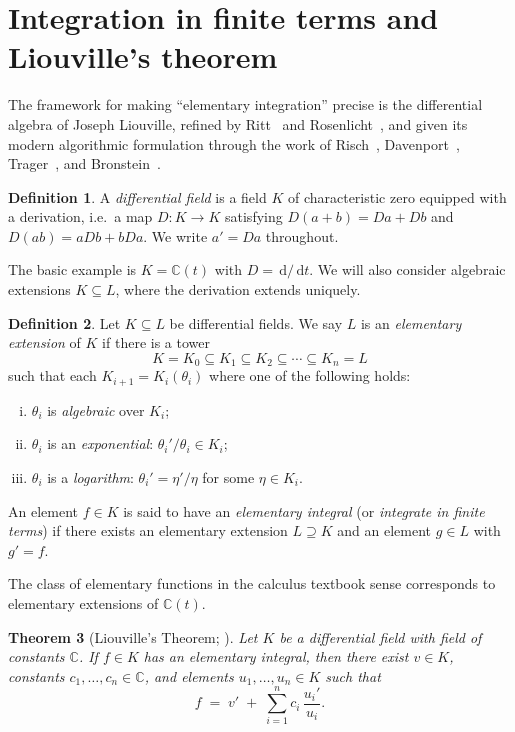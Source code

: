 \documentclass[11pt,a4paper]{article}
\theoremstyle{plain}
\newtheorem{theorem}{Theorem}[section]
\theoremstyle{definition}
\newtheorem{definition}[theorem]{Definition}
\theoremstyle{remark}
\newcommand{\C}{\mathbb{C}}
\renewcommand{\d}{\,\mathrm{d}}
\begin{document}
\section{Integration in finite terms and Liouville's theorem}
\label{sec:liouville}

The framework for making ``elementary integration'' precise is the differential algebra of Joseph Liouville, refined by Ritt~\cite{Ritt1948} and Rosenlicht~\cite{Rosenlicht1972}, and given its modern algorithmic formulation through the work of Risch~\cite{Risch1969,Risch1970}, Davenport~\cite{Davenport1981}, Trager~\cite{Trager1984}, and Bronstein~\cite{Bronstein2005}.

\begin{definition}\label{def:diffield}
A \emph{differential field} is a field $K$ of characteristic zero equipped with a derivation, i.e.\ a map $D \colon K \to K$ satisfying $D(a+b)=Da+Db$ and $D(ab)=aDb+bDa$. We write $a' = Da$ throughout.
\end{definition}

The basic example is $K = \C(t)$ with $D = \d/\d t$. We will also consider algebraic extensions $K\subseteq L$, where the derivation extends uniquely.

\begin{definition}\label{def:elementary}
Let $K\subseteq L$ be differential fields. We say $L$ is an \emph{elementary extension} of $K$ if there is a tower
\[
  K = K_0 \subseteq K_1 \subseteq K_2 \subseteq \cdots \subseteq K_n = L
\]
such that each $K_{i+1} = K_i(\theta_i)$ where one of the following holds:
\begin{enumerate}[(i)]
  \item $\theta_i$ is \emph{algebraic} over $K_i$;
  \item $\theta_i$ is an \emph{exponential}: $\theta_i'/\theta_i \in K_i$;
  \item $\theta_i$ is a \emph{logarithm}: $\theta_i' = \eta'/\eta$ for some $\eta \in K_i$.
\end{enumerate}
An element $f \in K$ is said to have an \emph{elementary integral} (or \emph{integrate in finite terms}) if there exists an elementary extension $L \supseteq K$ and an element $g\in L$ with $g' = f$.
\end{definition}

The class of elementary functions in the calculus textbook sense corresponds to elementary extensions of $\C(t)$.

\begin{theorem}[Liouville's Theorem; \cite{Rosenlicht1972}]\label{thm:liouville}
Let $K$ be a differential field with field of constants $\C$. If $f\in K$ has an elementary integral, then there exist $v\in K$, constants $c_1,\dots,c_n\in \C$, and elements $u_1,\dots,u_n \in K$ such that
\begin{equation}\label{eq:liouville}
  f \;=\; v' \;+\; \sum_{i=1}^n c_i\,\frac{u_i'}{u_i}.
\end{equation}
\end{theorem}
\end{document}

